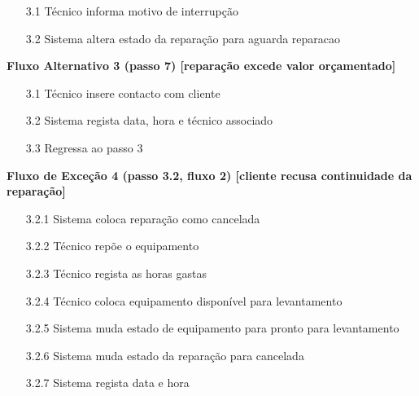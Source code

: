 \documentclass[../relatorio.tex]{subfiles}
\begin{document}
\begin{itemize}
\begin{flushleft}
          \end{flushleft}
          \begin{itemize}
              \item[3.1]{Técnico informa motivo de interrupção}
              \item[3.2]{Sistema altera estado da reparação para aguarda reparacao}
          \end{itemize}
          \begin{flushleft}
              \textbf{Fluxo Alternativo 3 (passo 7) [reparação excede valor orçamentado]}
          \end{flushleft}
          \begin{itemize}
              \item[3.1]{Técnico insere contacto com cliente}
              \item[3.2]{Sistema regista data, hora e técnico associado}
              \item[3.3]{Regressa ao passo 3}
          \end{itemize}
          \begin{flushleft}
              \textbf{Fluxo de Exceção 4 (passo 3.2, fluxo 2) [cliente recusa continuidade da reparação]}
          \end{flushleft}
          \begin{itemize}
              \item[3.2.1]{Sistema coloca reparação como cancelada}
              \item[3.2.2]{Técnico repõe o equipamento}
              \item[3.2.3]{Técnico regista as horas gastas}
              \item[3.2.4]{Técnico coloca equipamento disponível para levantamento}
              \item[3.2.5]{Sistema muda estado de equipamento para pronto para levantamento}
              \item[3.2.6]{Sistema muda estado da reparação para cancelada}
              \item[3.2.7]{Sistema regista data e hora} 
          \end{itemize}
\end{itemize}
\end{document}
